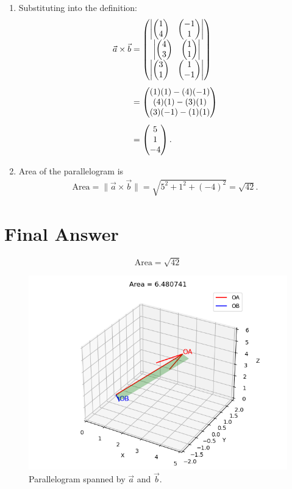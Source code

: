 \documentclass[12pt]{article}
\begin{document}
\begin{enumerate}
\item Substituting into the definition:
\begin{align}
\Vec{a}\times\Vec{b} &=
\begin{pmatrix}
\begin{vmatrix}\begin{pmatrix}1 \\ 4\end{pmatrix} & \begin{pmatrix}-1 \\ 1\end{pmatrix}\end{vmatrix} \\
\begin{vmatrix}\begin{pmatrix}4 \\ 3\end{pmatrix} & \begin{pmatrix}1 \\ 1\end{pmatrix}\end{vmatrix} \\
\begin{vmatrix}\begin{pmatrix}3 \\ 1\end{pmatrix} & \begin{pmatrix}1 \\ -1\end{pmatrix}\end{vmatrix}
\end{pmatrix} \\[1ex]
&= \begin{pmatrix}
(1)(1) - (4)(-1) \\
(4)(1) - (3)(1) \\
(3)(-1) - (1)(1)
\end{pmatrix} \\[1ex]
&= \begin{pmatrix}5 \\ 1 \\ -4\end{pmatrix}.
\end{align}

\item Area of the parallelogram is
\begin{align}
\text{Area} = \|\Vec{a}\times\Vec{b}\|
= \sqrt{5^2 + 1^2 + (-4)^2}
= \sqrt{42}.
\end{align}
\end{enumerate}

\section*{Final Answer}
\[
\boxed{\text{Area} = \sqrt{42}}
\]

\begin{figure}[h!]
\centering
\includegraphics[width=0.6\linewidth]{figs/fig.png}
\caption{Parallelogram spanned by $\Vec{a}$ and $\Vec{b}$.}
\end{figure}
\end{document}
